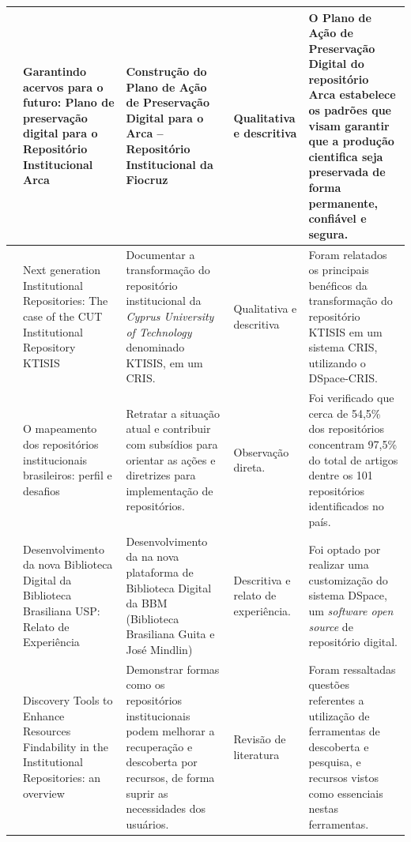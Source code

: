 \begin{landscape}
\begin{table}[H]
{\begin{tabular}{|p{5cm}|p{12cm}|p{12cm}|p{4cm}|p{13cm}|}
                \cite{2020:Queiroz}          & Garantindo acervos para o futuro: Plano de preservação digital para o Repositório Institucional Arca                                      & Construção do Plano de Ação de Preservação Digital para o Arca – Repositório Institucional da Fiocruz                                                       & Qualitativa e descritiva            & O Plano de Ação de Preservação Digital do repositório Arca estabelece os padrões que visam garantir que a produção cientifica seja preservada de forma permanente, confiável e segura.       \\ \hline
                \cite{2019:Zervas}           & Next generation Institutional Repositories: The case of the CUT Institutional Repository KTISIS                                           & Documentar a transformação do repositório institucional da \emph{Cyprus University of Technology} denominado KTISIS, em um CRIS.                            & Qualitativa e descritiva            & Foram relatados os principais benéficos da transformação do repositório KTISIS em um sistema CRIS, utilizando o DSpace-CRIS.                                                                 \\ \hline
                \cite{2019:Weitzel}          & O mapeamento dos repositórios institucionais brasileiros: perfil e desafios                                                               & Retratar a situação atual e contribuir com subsídios para orientar as ações e diretrizes para implementação de repositórios.                                & Observação direta.                  & Foi verificado que cerca de 54,5\% dos repositórios concentram 97,5\% do total de artigos dentre os 101 repositórios identificados no país.                                                  \\ \hline
                \cite{2019:RodrigoMoreira}   & Desenvolvimento da nova Biblioteca Digital da Biblioteca Brasiliana USP: Relato de Experiência                                            & Desenvolvimento da na nova plataforma de Biblioteca Digital da BBM (Biblioteca Brasiliana Guita e José Mindlin)                                             & Descritiva e relato de experiência. & Foi optado por realizar uma customização do sistema DSpace, um \emph{software open source} de repositório digital.                                                                           \\ \hline
                \cite{2019:Mettai}           & Discovery Tools to Enhance Resources Findability in the Institutional Repositories: an overview                                           & Demonstrar formas como os repositórios institucionais podem melhorar a recuperação e descoberta por recursos, de forma suprir as necessidades dos usuários. & Revisão de literatura               & Foram ressaltadas questões referentes a utilização de ferramentas de descoberta e pesquisa, e recursos vistos como essenciais nestas ferramentas.                                            \\ \hline

\end{tabular}}
\end{table}
\end{landscape}
